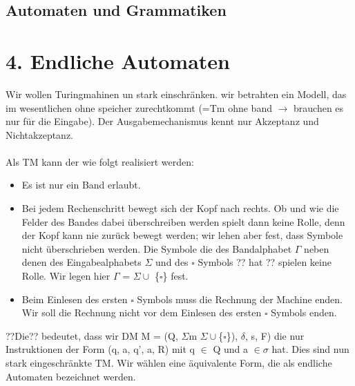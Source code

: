 \documentclass[a4paper,11pt]{article}
\begin{document}
\begin{center}
\section*{Automaten und Grammatiken}
\end{center}

\section*{4. Endliche Automaten}
Wir wollen Turingmahinen un stark einschränken. 
wir betrahten ein Modell, das im wesentlichen ohne speicher
zurechtkommt (=Tm ohne band $\longrightarrow$  brauchen es nur für die Eingabe).
Der Ausgabemechanismus kennt nur Akzeptanz und Nichtakzeptanz.\\\\
Als TM kann der wie folgt realisiert werden:
\begin{itemize}
    \item Es ist nur ein Band erlaubt.
    \item Bei jedem Rechenschritt bewegt sich der Kopf nach rechts. Ob und wie die Felder des Bandes dabei überschreiben werden spielt dann keine Rolle, denn der Kopf kann nie zurück bewegt werden; wir lehen aber fest, dass Symbole nicht überschrieben werden. Die Symbole die des Bandalphabet $\Gamma $ neben denen des Eingabealphabets $\Sigma $ und des $\square $  Symbols ?? hat ?? spielen keine Rolle. Wir legen hier $\varGamma $ = $\Sigma \cup $ \{$\square $\} fest.
    \item Beim Einlesen des ersten $\square $ Symbols muss die Rechnung der Machine enden. Wir soll die Rechnung nicht vor dem Einlesen des ersten $\square $ Symbols enden. 
\end{itemize}
??Die?? bedeutet, dass wir DM M = (Q, $\Sigma$m $\Sigma\cup $\{$\square $\}), $\delta$, s, F) die nur Instruktionen der Form (q, a, q', a, R) mit q $\in$ Q und a $\in \sigma$ hat.
Dies sind nun stark eingeschränkte TM. Wir wählen eine äquivalente Form, die als endliche Automaten bezeichnet werden. 
\end{document}
